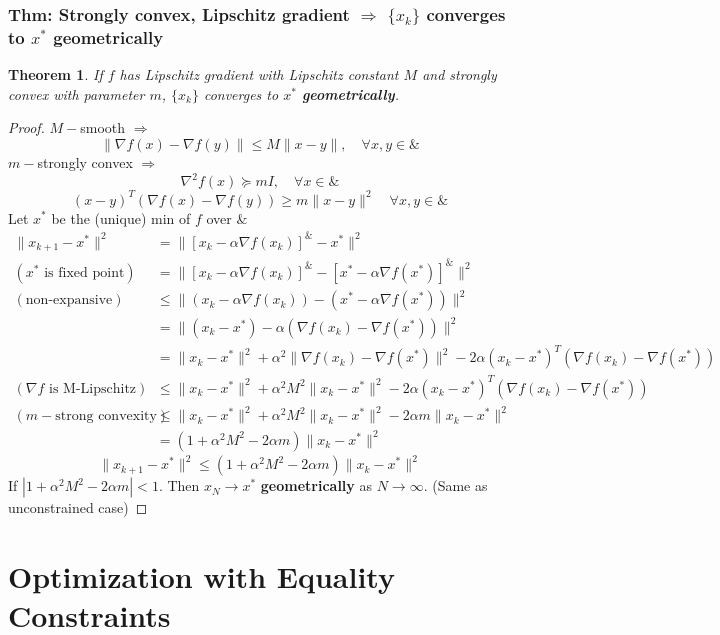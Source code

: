 \documentclass[11pt,a4paper]{article}
\newtheorem{theorem}{Theorem}
\begin{document}
\subsubsection{Thm: Strongly convex, Lipschitz gradient $\Rightarrow$ $\{x_k\}$ converges to $x^*$ geometrically}
\begin{theorem}
    If $f$ has Lipschitz gradient with Lipschitz constant $M$ and strongly convex with parameter $m$, $\{x_k\}$ converges to $x^*$ \textbf{geometrically}.
\end{theorem}
\begin{proof}
$M-$smooth $\Rightarrow$ $$\|\nabla f(x)-\nabla f(y)\|\leq M\|x-y\|,\quad \forall x,y\in\&$$
$m-$strongly convex $\Rightarrow$
$$\nabla^2 f(x)\succeq mI,\quad \forall x\in\&$$
$$(x-y)^T(\nabla f(x)-\nabla f(y))\geq m\|x-y\|^2\quad \forall x,y\in\&$$
Let $x^*$ be the (unique) min of $f$ over $\&$
\begin{equation}
    \begin{aligned}
        \|x_{k+1}-x^*\|^2&=\|[x_k-\alpha \nabla f(x_k)]^\&-x^*\|^2\\
        (x^*\text{ is fixed point})\quad \quad &=\|[x_k-\alpha \nabla f(x_k)]^\&-[x^*-\alpha \nabla f(x^*)]^\&\|^2\\
        (\text{non-expansive})\quad \quad &\leq \|(x_k-\alpha \nabla f(x_k))-(x^*-\alpha \nabla f(x^*))\|^2\\
        &=\|(x_k-x^*)-\alpha( \nabla f(x_k)- \nabla f(x^*))\|^2\\
        &=\|x_k-x^*\|^2+\alpha^2\|\nabla f(x_k)-\nabla f(x^*)\|^2-2\alpha(x_k-x^*)^T(\nabla f(x_k)-\nabla f(x^*))\\
        (\nabla f\text{ is M-Lipschitz})\quad \quad &\leq \|x_k-x^*\|^2+\alpha^2M^2\|x_k-x^*\|^2-2\alpha(x_k-x^*)^T(\nabla f(x_k)-\nabla f(x^*))\\
        (m-\text{strong convexity})\quad &\leq \|x_k-x^*\|^2+\alpha^2M^2\|x_k-x^*\|^2-2\alpha m\|x_k-x^*\|^2\\
        &=(1+\alpha^2M^2-2\alpha m)\|x_k-x^*\|^2
    \end{aligned}
    \nonumber
\end{equation}
$$\|x_{k+1}-x^*\|^2\leq (1+\alpha^2M^2-2\alpha m)\|x_k-x^*\|^2$$
If $|1+\alpha^2M^2-2\alpha m|<1$. Then $x_N \rightarrow x^*$ \textbf{geometrically} as $N \rightarrow \infty$. (Same as unconstrained case)
\end{proof}



\section{Optimization with Equality Constraints}
\end{document}

